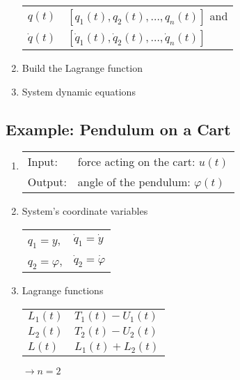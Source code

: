 \documentclass[10pt,a4paper]{scrartcl}
\begin{document}
\begin{multicols*}{3}
\begin{enumerate}
\begin{tabular}{l@{ = }l}
$q(t)$&$[q_1(t),q_2(t),\ldots,q_n(t)]$ and\\
$\dot{q}(t)$&$[\dot{q}_1(t),\dot{q}_2(t),\ldots,\dot{q}_n(t)]$
\end{tabular}
\item Build the Lagrange function
\item System dynamic equations
\end{enumerate}


\subsection{Example: Pendulum on a Cart}


\begin{enumerate}
\item \begin{tabular}{ll}Input:& force acting on the cart: $u(t)$\\Output:& angle of the pendulum: $\varphi(t)$\end{tabular}
\item System's coordinate variables
\begin{tabular}{ll}
$q_1 = y$,&$\dot{q}_1=\dot{y}$\\
$q_2 = \varphi$,&$\dot{q}_2=\dot{\varphi}$
\end{tabular}
\item Lagrange functions

\begin{tabular}{l@{ = }l}
$L_1(t)$&$T_1(t)-U_1(t)$\\
$L_2(t)$&$T_2(t)-U_2(t)$\\
$L(t)$&$L_1(t)+L_2(t)$
\end{tabular}\hfill$\rightarrow n=2$


\end{enumerate}
\end{multicols*}
\end{document}
